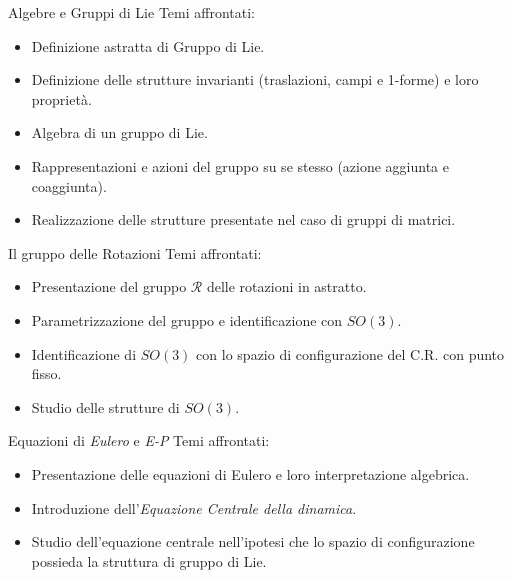 \documentclass[unknownkeysallowed]{beamer}
\begin{document}
\begin{frame}{Algebre e Gruppi di Lie}
Temi affrontati:
\begin{itemize}
\item Definizione astratta di Gruppo di Lie.
\item Definizione delle strutture invarianti (traslazioni, campi e 1-forme) e loro proprietà.
\item Algebra di un gruppo di Lie.
\item Rappresentazioni e azioni del gruppo su se stesso (azione aggiunta e coaggiunta).
\item Realizzazione delle strutture presentate nel caso di gruppi di matrici.
\end{itemize}
\end{frame}

\begin{frame}{Il gruppo delle Rotazioni}
Temi affrontati:
\begin{itemize}
\item Presentazione del gruppo $\mathscr{R}$ delle rotazioni in astratto.
\item Parametrizzazione del gruppo e identificazione con $SO(3)$.
\item Identificazione di $SO(3)$ con lo spazio di configurazione del C.R. con punto fisso.
\item Studio delle strutture di $SO(3)$.
\end{itemize}
\end{frame}


\begin{frame}{Equazioni di \emph{Eulero} e \emph{E-P}}
Temi affrontati:
\begin{itemize}
\item Presentazione delle equazioni di Eulero e loro interpretazione algebrica.
\item Introduzione dell'\emph{Equazione Centrale della dinamica}.
\item Studio dell'equazione centrale nell'ipotesi che lo spazio di configurazione possieda la struttura di gruppo di Lie.
\end{itemize} \end{frame}
\end{document}
